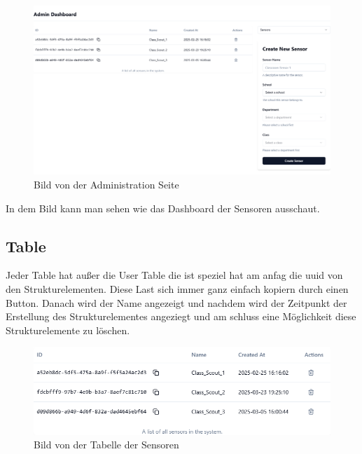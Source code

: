 \begin{inhalt}
\begin{enumerate}[label=\textbf{\arabic*.}]
\begin{figure}[!htb]
\centering
\includegraphics[width=1\textwidth]{files/Thomas/pics/Website/admin/devices/sensors-admin-screen.png}
\caption[Bild von der Administration Seite]{Bild von der Administration Seite}
\label{fig:gehaeuse_internet_bild}
\end{figure}


In dem Bild kann man sehen wie das Dashboard der Sensoren ausschaut.

\newpage

\subsection{Table}

Jeder Table hat außer die User Table die ist speziel hat am anfag die uuid von den Strukturelementen. Diese Last sich immer ganz einfach kopiern durch einen Button. Danach wird der Name angezeigt und nachdem wird der Zeitpunkt der Erstellung des Strukturelementes angeziegt und am schluss eine Möglichkeit diese Strukturelemente zu löschen. 

\begin{figure}[!htb]
\centering
\includegraphics[width=1\textwidth]{files/Thomas/pics/Website/admin/sensors/sensor-table.png}
\caption[Bild von der Tabelle der Sensoren]{Bild von der Tabelle der Sensoren}
\label{fig:gehaeuse_internet_bild}
\end{figure}


\end{enumerate}
\end{inhalt}
